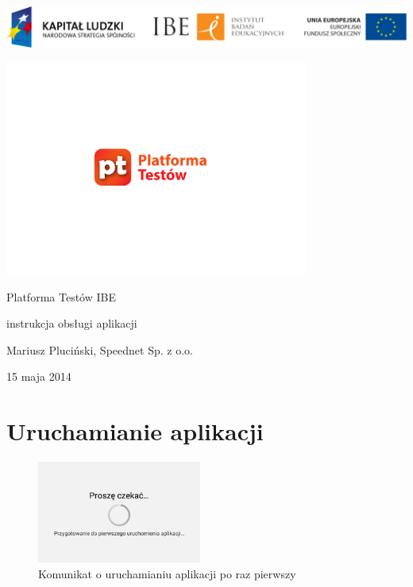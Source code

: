 \documentclass[a4paper,10pt,twosided]{book}
\begin{document}
\thispagestyle{empty}
\begin{titlepage}
{\centering
\noindent\includegraphics[width=\textwidth]{eu_logo.png}

\hrulefill

\vspace{\fill}
\noindent\includegraphics[width=0.75\textwidth]{app_logo.pdf}

\vspace{-3cm}
\noindent\LARGE Platforma Testów IBE\par%
\noindent\large instrukcja obsługi aplikacji\par%
\vspace{10cm}
\noindent\Large Mariusz Pluciński, Speednet Sp. z o.o.\par%
\vspace{2cm}
\noindent\Large 15 maja 2014\par%
\vspace{\fill}
}
\end{titlepage}
\restoregeometry

\tableofcontents


\chapter{Uruchamianie aplikacji}
\label{chap:launch}

\begin{figure}
\vspace{-1em}
\includegraphics[width=0.48\textwidth]{activity_launch-first.png}
\caption{Komunikat o uruchamianiu aplikacji po raz pierwszy}
\label{fig:launch_firstrun}
\end{figure}
\end{document}
